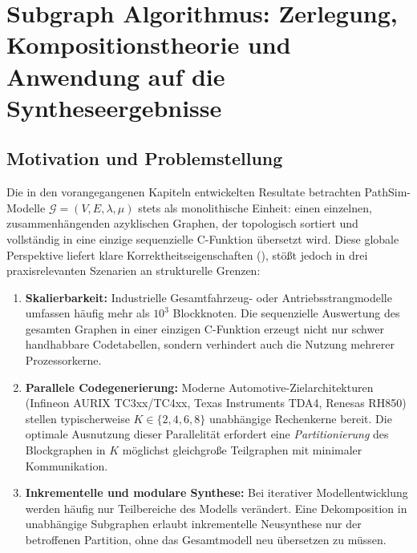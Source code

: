 ﻿\documentclass[12pt,a4paper]{article}
\theoremstyle{definition}
\begin{document}
\section{Subgraph Algorithmus: Zerlegung, Kompositionstheorie und Anwendung auf die Syntheseergebnisse}
\label{sec:subgraph}

\subsection{Motivation und Problemstellung}

Die in den vorangegangenen Kapiteln entwickelten Resultate betrachten
PathSim-Modelle $\mathcal{G} = (V, E, \lambda, \mu)$ stets als monolithische
Einheit: einen einzelnen, zusammenhängenden azyklischen Graphen, der topologisch
sortiert und vollständig in eine einzige sequenzielle C-Funktion übersetzt wird.
Diese globale Perspektive liefert klare Korrektheitseigenschaften
(), stößt jedoch in drei praxisrelevanten
Szenarien an strukturelle Grenzen:

\begin{enumerate}[label=(\roman*)]
  \item \textbf{Skalierbarkeit:} Industrielle Gesamtfahrzeug- oder
        Antriebsstrangmodelle umfassen häufig mehr als $10^3$ Blockknoten.
        Die sequenzielle Auswertung des gesamten Graphen in einer einzigen
        C-Funktion erzeugt nicht nur schwer handhabbare Codetabellen, sondern
        verhindert auch die Nutzung mehrerer Prozessorkerne.

  \item \textbf{Parallele Codegenerierung:} Moderne Automotive-Zielarchitekturen
        (Infineon AURIX TC3xx/TC4xx, Texas Instruments TDA4, Renesas RH850)
        stellen typischerweise $K \in \{2, 4, 6, 8\}$ unabhängige Rechenkerne
        bereit. Die optimale Ausnutzung dieser Parallelität erfordert eine
        \emph{Partitionierung} des Blockgraphen in $K$ möglichst gleichgroße
        Teilgraphen mit minimaler Kommunikation.

  \item \textbf{Inkrementelle und modulare Synthese:} Bei iterativer
        Modellentwicklung werden häufig nur Teilbereiche des Modells verändert.
        Eine Dekomposition in unabhängige Subgraphen erlaubt inkrementelle
        Neusynthese nur der betroffenen Partition, ohne das Gesamtmodell
        neu übersetzen zu müssen.
\end{enumerate}
\end{document}
